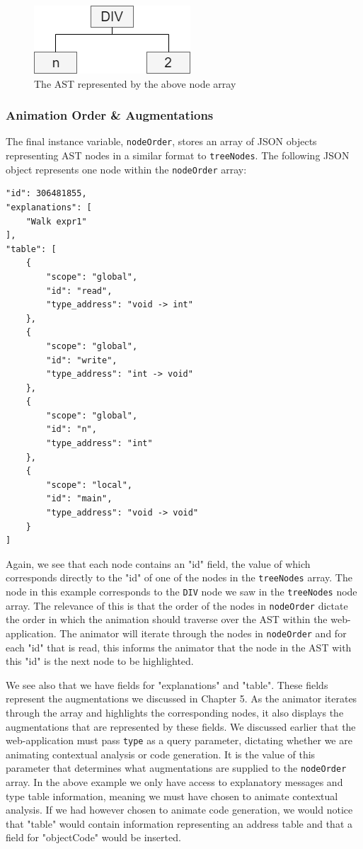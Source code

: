 \documentclass{l4proj}
\begin{document}
\begin{figure}[h]
\centering
\includegraphics[scale=0.6]{images/treeNodes.png}
\caption{The AST represented by the above node array}
\label{fig:treeNodes}	
\end{figure}

\subsubsection{Animation Order \& Augmentations}
The final instance variable, \texttt{nodeOrder}, stores an array of JSON objects representing AST nodes in a similar format to \texttt{treeNodes}. The following JSON object represents one node within the \texttt{nodeOrder} array:
\begin{lstlisting}
"id": 306481855,
"explanations": [
	"Walk expr1"
],
"table": [
	{
		"scope": "global",
		"id": "read",
		"type_address": "void -> int"
	},
	{
		"scope": "global",
		"id": "write",
		"type_address": "int -> void"
	},
	{
		"scope": "global",
		"id": "n",
		"type_address": "int"
	},
	{
		"scope": "local",
		"id": "main",
		"type_address": "void -> void"
	}
]
 \end{lstlisting}

Again, we see that each node contains an "id" field, the value of which corresponds directly to the "id" of one of the nodes in the \texttt{treeNodes} array. The node in this example corresponds to the \texttt{DIV} node we saw in the \texttt{treeNodes} node array. The relevance of this is that the order of the nodes in \texttt{nodeOrder} dictate the order in which the animation should traverse over the AST within the web-application. The animator will iterate through the nodes in \texttt{nodeOrder} and for each "id" that is read, this informs the animator that the node in the AST with this "id" is the next node to be highlighted. 

We see also that we have fields for "explanations" and "table". These fields represent the augmentations we discussed in Chapter 5. As the animator iterates through the array and highlights the corresponding nodes, it also displays the augmentations that are represented by these fields. We discussed earlier that the web-application must pass \texttt{type} as a query parameter, dictating whether we are animating contextual analysis or code generation. It is the value of this parameter that determines what augmentations are supplied to the \texttt{nodeOrder} array. In the above example we only have access to explanatory messages and type table information, meaning we must have chosen to animate contextual analysis. If we had however chosen to animate code generation, we would notice that "table" would contain information representing an address table and that a field for "objectCode" would be inserted.
\end{document}
